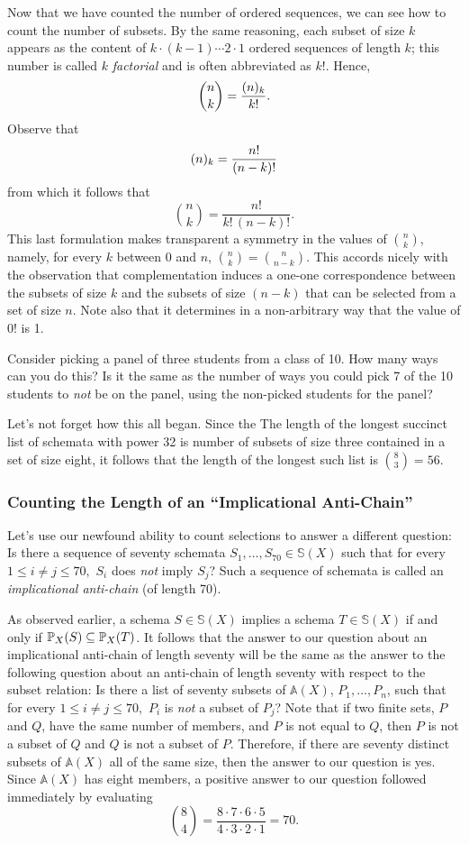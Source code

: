 Now that we have counted the number of ordered sequences, we can see how to count the number of subsets. By the same reasoning, each subset of size $k$ appears as the content of $k\cdot(k-1)\cdots2\cdot1$ ordered sequences of length $k$; this number is called $k$ \emph{factorial} and is often abbreviated as $k!$. Hence, 
\[\binom{n}{k} = \frac{\oc{n}{k}}{k!}.\]  
Observe that 
\[\oc{n}{k}=\frac{n!}{(n-k)!}\]
from which it follows that 
\[\binom{n}{k} = \frac{n!}{k!\,(n-k)!}.\]
This last formulation makes transparent a symmetry in the values of $\binom{n}{k}$, namely, for every $k$ between $0$ and $n$, $\binom{n}{k}=\binom{n}{n-k}$. This accords nicely with the observation that complementation induces a one-one correspondence between the subsets of size $k$ and the subsets of size $(n-k)$ that can be selected from a set of size $n$. Note also that it determines in a non-arbitrary way that the value of $0!$ is 1.

\begin{aside}
    Consider picking a panel of three students from a class of 10. How many ways can you do this? Is it the same as the number of ways you could pick 7 of the 10 students to \emph{not} be on the panel, using the non-picked students for the panel?
\end{aside}

Let's not forget how this all began. Since the The length of the longest succinct list of schemata with power 32 is number of subsets of size three contained in a set of size eight, it follows that the length of the longest such list is $\binom{8}{3}=56$.

\subsubsection*{Counting the Length of an ``Implicational Anti-Chain''}
Let's use our newfound ability to count selections to answer a different question: Is there a sequence of seventy schemata $S_1,\ldots,S_{70}\in\mathbb{S}(X)$ such that for every $1\leq i\neq j\leq 70,$ $S_i$ does \emph{not} imply $S_j$? Such a sequence of schemata is called an \emph{implicational anti-chain} (of length 70).

As observed earlier, a schema $S\in\mathbb{S}(X)$ implies a schema $T\in\mathbb{S}(X)$ if and only if $\prop{S}{X}\subseteq\prop{T}{X}$. It follows that the answer to our question about an implicational anti-chain of length seventy will be the same as the answer to the following question about an anti-chain of length seventy with respect to the subset relation: Is there a list of seventy subsets of $\mathbb{A}(X)$, $P_1,\ldots,P_n$, such that for every $1\leq i\neq j\leq 70,$ $P_i$ is \emph{not} a subset of $P_j$? Note that if two finite sets, $P$ and $Q$, have the same number of members, and $P$ is not equal to $Q$, then $P$ is not a subset of $Q$ and $Q$ is not a subset of $P$. Therefore, if there are seventy distinct subsets of $\mathbb{A}(X)$ all of the same size, then the answer to our question is yes. Since $\mathbb{A}(X)$ has eight members, a positive answer to our question followed immediately by evaluating 
\[
\binom{8}{4}= \frac{8\cdot7\cdot6\cdot5}{4\cdot3\cdot2\cdot1}=70.
\] 

